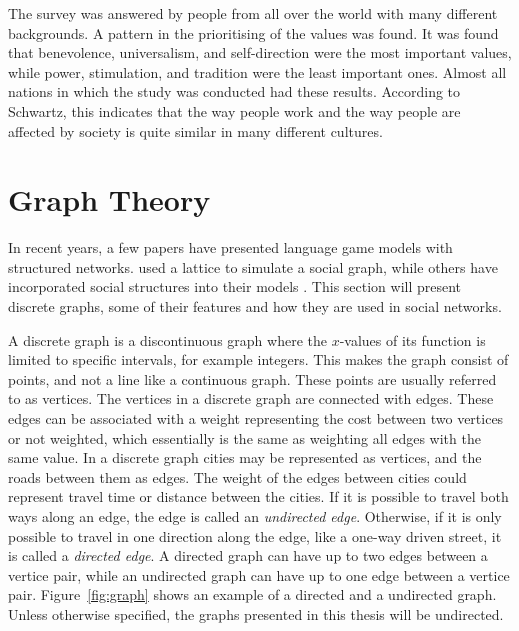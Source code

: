 The survey was answered by people from all over the world with many different backgrounds. A pattern in the prioritising of the values was found. It was found that benevolence, universalism, and self-direction were the most important values, while power, stimulation, and tradition were the least important ones. Almost all nations in which the study was conducted had these results. According to Schwartz, this indicates that the way people work and the way people are affected by society is quite similar in many different cultures.


\section{Graph Theory}
In recent years, a few papers have presented language game models with structured networks. \citet{lipowska2011naming} used a lattice to simulate a social graph, while others have incorporated social structures into their models \citep{lekvam2014co, gong2004computational}. This section will present discrete graphs, some of their features and how they are used in social networks.

A discrete graph is a discontinuous graph where the $x$-values of its function is limited to specific intervals, for example integers. This makes the graph consist of points, and not a line like a continuous graph. These points are usually referred to as vertices. The vertices in a discrete graph are connected with edges. These edges can be associated with a weight representing the cost between two vertices or not weighted, which essentially is the same as weighting all edges with the same value. In a discrete graph cities may be represented as vertices, and the roads between them as edges. The weight of the edges between cities could represent travel time or distance between the cities. If it is possible to travel both ways along an edge, the edge is called an \textit{undirected edge}. Otherwise, if it is only possible to travel in one direction along the edge, like a one-way driven street, it is called a \textit{directed edge}. A directed graph can have up to two edges between a vertice pair, while an undirected graph can have up to one edge between a vertice pair. Figure~\ref{fig:graph} shows an example of a directed and a undirected graph. Unless otherwise specified, the graphs presented in this thesis will be undirected.

